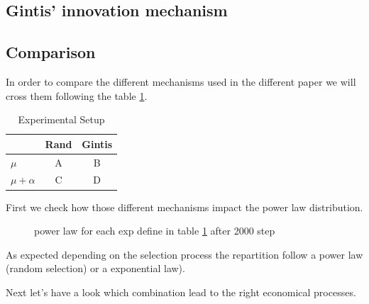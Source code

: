 \documentclass[a4paper]{article}
\begin{document}
\subsection{Gintis' innovation mechanism}




\subsection{Comparison}
In order to compare the different mechanisms used in the different paper we will cross them  following the table \ref{tab:exp}.
\begin{table}
	\centering
	\begin{tabular}{l|c|c}
		& Rand & Gintis \\\hline
		$\mu$ &A & B \\
		$\mu +\alpha$ & C & D \\
	\end{tabular}
	\caption{Experimental Setup}
	\label{tab:exp}
\end{table}


First we check how those different mechanisms impact the power law distribution.

\begin{figure}[hbp]
	\begin{center}
	\end{center}
	\caption{power law for each exp define in table \ref{tab:exp} after 2000 step}
	\label{fig:powerABCD}
\end{figure}

As expected depending on the selection process the repartition follow a power law (random selection) or a exponential law).

Next let's have a look which combination lead to the right economical processes.
\end{document}
